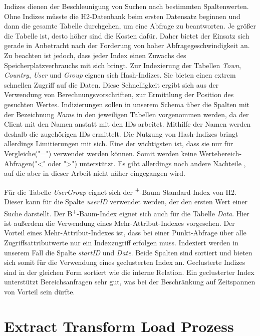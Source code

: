 Indizes dienen der Beschleunigung von Suchen nach bestimmten Spaltenwerten. Ohne Indizes müsste die H2-Datenbank beim ersten Datensatz beginnen und dann die gesamte Tabelle durchgehen, um eine Abfrage zu beantworten. Je größer die Tabelle ist, desto höher sind die Kosten dafür. Daher bietet der Einsatz sich gerade in Anbetracht nach der Forderung von hoher Abfragegeschwindigkeit an. Zu beachten ist jedoch, dass jeder Index einen Zuwachs des Speicherplatzverbrauchs mit sich bringt. Zur Indexierung der Tabellen \textit{Town}, \textit{Country}, \textit{User} und \textit{Group} eignen sich Hash-Indizes. Sie bieten einen extrem schnellen Zugriff auf die Daten. Diese Schnelligkeit ergibt sich aus der Verwendung von Berechnungsvorschriften, zur Ermittlung der Position des gesuchten Wertes. Indizierungen sollen in unserem Schema über die Spalten mit der Bezeichnung \textit{Name} in den jeweiligen Tabellen vorgenommen werden, da der Client mit den Namen anstatt mit den IDs arbeitet. Mithilfe der Namen werden deshalb die zugehörigen IDs ermittelt. Die Nutzung von Hash-Indizes bringt allerdings Limitierungen mit sich. Eine der wichtigsten ist, dass sie nur für Vergleiche("=") verwendet werden können. Somit werden keine Wertebereich-Abfragen("<" oder ">") unterstützt. Es gibt allerdings noch andere Nachteile \cite{SWB-352401869}, auf die aber in dieser Arbeit nicht näher eingegangen wird. 

Für die Tabelle \textit{UserGroup} eignet sich der \textsuperscript{+}-Baum Standard-Index von H2. Dieser kann für die Spalte \textit{userID} verwendet werden, der den ersten Wert einer Suche darstellt. Der B\textsuperscript{+}-Baum-Index eignet sich auch für die Tabelle \textit{Data}. Hier ist außerdem die Verwendung eines Mehr-Attribut-Indexes vorgesehen. Der Vorteil eines Mehr-Attribut-Indexes ist, dass bei einer Punkt-Abfrage über alle Zugriffsattributwerte nur ein Indexzugriff erfolgen muss. Indexiert werden in unserem Fall die Spalte \textit{startID} und \textit{Date}. Beide Spalten sind sortiert und bieten sich somit für die Verwendung eines geclusterten Index an. Geclusterte Indizes sind in der gleichen Form sortiert wie die interne Relation. Ein geclusterter Index unterstützt Bereichsanfragen sehr gut, was bei der Beschränkung auf Zeitspannen von Vorteil sein dürfte.       


\section{Extract Transform Load Prozess}

